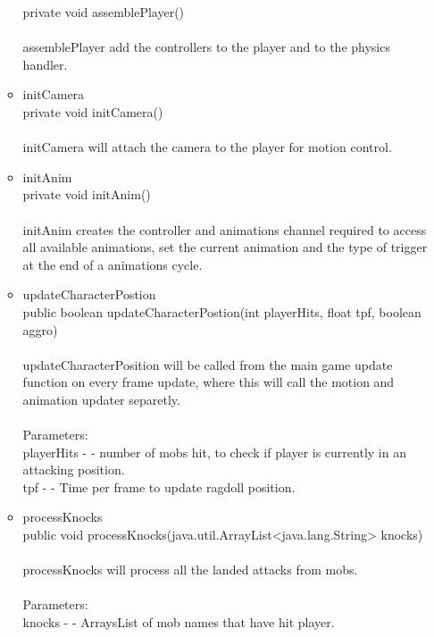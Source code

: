 \documentclass[letterpaper]{article}
\begin{document}
\begin{itemize}
\begin{itemize}
											private void assemblePlayer() \\ \\
											assemblePlayer add the controllers to the player and to the physics handler. \\
									\item	initCamera \\
											private void initCamera() \\ \\
											initCamera will attach the camera to the player for motion control. \\
									\item	initAnim \\
											private void initAnim() \\ \\
											initAnim creates the controller and animations channel required to access all available animations, set the current animation and the type of trigger at the end of a animations cycle.
									\item	updateCharacterPostion \\
											public boolean updateCharacterPostion(int playerHits,
											                             float tpf,
											                             boolean aggro) \\ \\
											updateCharacterPosition will be called from the main game update function on every frame update, where this will call the motion and animation updater separetly. \\ \\
											Parameters: \\
											playerHits - - number of mobs hit, to check if player is currently in an attacking position. \\
											tpf - - Time per frame to update ragdoll position. \\
									\item	processKnocks \\
											public void processKnocks(java.util.ArrayList<java.lang.String> knocks) \\ \\
											processKnocks will process all the landed attacks from mobs. \\ \\
											Parameters: \\
											knocks - - ArraysList of mob names that have hit player. \\

\end{itemize}
\end{itemize}
\end{document}
